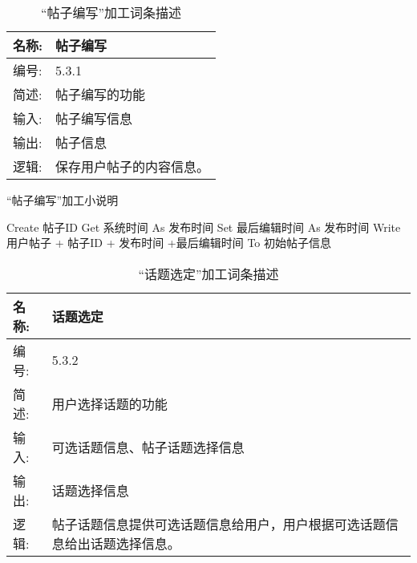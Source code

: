 \begin{table}[H]  
\caption{“帖子编写”加工词条描述}  
\begin{center}  
    \begin{tabular}{l p{11cm}} 
        \hline
        \quad 名称:  &  帖子编写 \\
        \hline
        \quad 编号:  & 5.3.1 \\
        \hline
        \quad 简述:  & 帖子编写的功能 \\
        \hline
        \quad 输入:  & 帖子编写信息 \\
        \hline
        \quad 输出:  & 帖子信息 \\
        \hline
        \quad 逻辑:  & 保存用户帖子的内容信息。 \\
        \hline
    \end{tabular}
    \label{tab1}
\end{center}
\end{table}

\begin{algorithm}[H]
    \renewcommand{\thealgorithm}{}
    \caption{“帖子编写”加工小说明} 
    \label{alg3} 
    \begin{algorithmic}[1]
        \STATE Create 帖子ID
        \STATE Get 系统时间 As 发布时间
        \STATE Set 最后编辑时间 As 发布时间
        \STATE Write 用户帖子 + 帖子ID + 发布时间 +最后编辑时间 To 初始帖子信息
    \end{algorithmic} 
\end{algorithm}

\begin{table}[H]  
\caption{“话题选定”加工词条描述}  
\begin{center}  
    \begin{tabular}{l p{11cm}} 
        \hline
        \quad 名称:  &  话题选定 \\
        \hline
        \quad 编号:  & 5.3.2 \\
        \hline
        \quad 简述:  & 用户选择话题的功能 \\
        \hline
        \quad 输入:  & 可选话题信息、帖子话题选择信息 \\
        \hline
        \quad 输出:  & 话题选择信息 \\
        \hline
        \quad 逻辑:  & 帖子话题信息提供可选话题信息给用户，用户根据可选话题信息给出话题选择信息。 \\
        \hline
    \end{tabular}
    \label{tab1}
\end{center}
\end{table}

